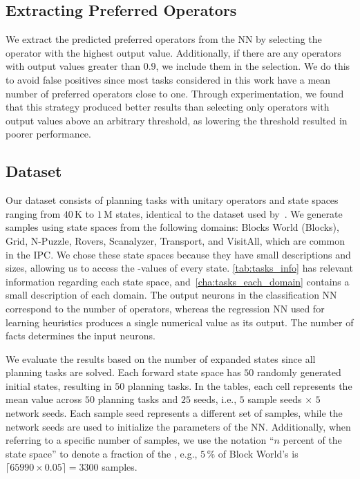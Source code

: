 \documentclass[ppgc,diss,english]{iiufrgs}
\begin{document}
\subsection{Extracting Preferred Operators}
\label{sec:exp-extracting-pos}
We extract the predicted preferred operators from the NN by selecting the operator with the highest output value. Additionally, if there are any operators with output values greater than $0.9$, we include them in the selection. We do this to avoid false positives since most tasks considered in this work have a mean number of preferred operators close to one. Through experimentation, we found that this strategy produced better results than selecting only operators with output values above an arbitrary threshold, as lowering the threshold resulted in poorer performance.


\subsection{Dataset}
\label{sec:exp-dataset}
Our dataset consists of planning tasks with unitary operators and state spaces ranging from $40$\,K to $1$\,M states, identical to the dataset used by~\citet{Bettker.etal/2022}. We generate samples using state spaces from the following domains: Blocks World (Blocks), Grid, N-Puzzle, Rovers, Scanalyzer, Transport, and VisitAll, which are common in the IPC.
We chose these state spaces because they have small descriptions and sizes, allowing us to access the \hstar-values of every state.
\cref{tab:tasks_info} has relevant information regarding each state space, and~\vref{cha:tasks_each_domain} contains a small description of each domain.
The output neurons in the classification NN correspond to the number of operators, whereas the regression NN used for learning heuristics produces a single numerical value as its output. The number of facts determines the input neurons.



We evaluate the results based on the number of expanded states since all planning tasks are solved. Each forward state space \fsp has $50$ randomly generated initial states, resulting in $50$ planning tasks. %
In the tables, each cell represents the mean value across $50$ planning tasks and $25$ seeds, i.e., $5$ sample seeds $\times$ $5$ network seeds. Each sample seed represents a different set of samples, while the network seeds are used to initialize the parameters of the NN.
Additionally, when referring to a specific number of samples, we use the notation ``$n$ percent of the state space'' to denote a fraction of the \fsp, e.g., $5\,\%$ of Block World's \fsp is $\lceil 65990 \times 0.05 \rceil = 3300$ samples.
\end{document}
